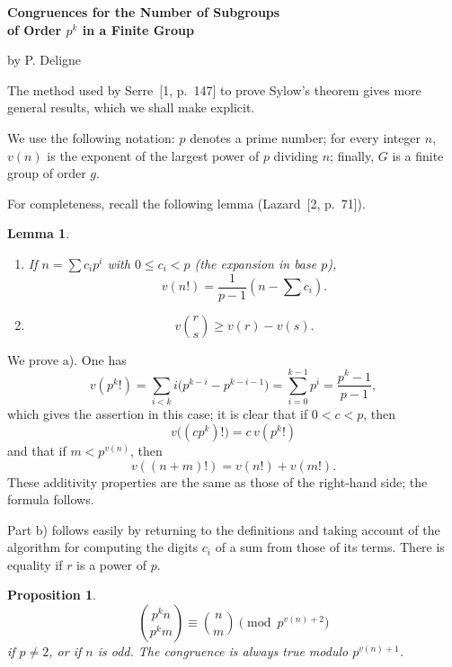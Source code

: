 \documentclass[11pt]{article}
\newtheorem{lemma}{Lemma}
\newtheorem{proposition}{Proposition}
\begin{document}
\begin{center}
{\Large\bfseries Congruences for the Number of Subgroups\\
of Order \(p^k\) in a Finite Group\par}
\vspace{1em}
by P. Deligne
\end{center}

\bigskip

The method used by Serre~[1, p.~147] to prove Sylow's theorem gives more
general results, which we shall make explicit.

We use the following notation: \(p\) denotes a prime number; for every integer
\(n\), \(v(n)\) is the exponent of the largest power of \(p\) dividing \(n\);
finally, \(G\) is a finite group of order \(g\).

For completeness, recall the following lemma (Lazard~[2, p.~71]).

\begin{lemma}
\begin{enumerate}[label=\alph*)]
\item If \(n=\sum c_i p^i\) with \(0\leq c_i<p\) (the expansion in base \(p\)),
\[
        v(n!)=\frac{1}{p-1}\left(n-\sum c_i\right).
\]
\item \[
        v\binom{r}{s}\geq v(r)-v(s).
\]
\end{enumerate}
\end{lemma}

We prove a). One has
\[
v(p^k!)=\sum_{i<k} i\bigl(p^{k-i}-p^{k-i-1}\bigr)
       =\sum_{i=0}^{k-1}p^i=\frac{p^k-1}{p-1},
\]
which gives the assertion in this case; it is clear that if \(0<c<p\), then
\[
        v\bigl((cp^k)!\bigr)=c\,v(p^k!)
\]
and that if \(m<p^{v(n)}\), then
\[
        v((n+m)!)=v(n!)+v(m!).
\]
These additivity properties are the same as those of the right-hand side; the
formula follows.

Part b) follows easily by returning to the definitions and taking account of the
algorithm for computing the digits \(c_i\) of a sum from those of its terms.
There is equality if \(r\) is a power of \(p\).

\begin{proposition}
\[
        \binom{p^k n}{p^k m}\equiv \binom{n}{m}\pmod {p^{v(n)+2}}
\]
if \(p\neq2\), or if \(n\) is odd. The congruence is always true modulo
\(p^{v(n)+1}\).
\end{proposition}
\end{document}
